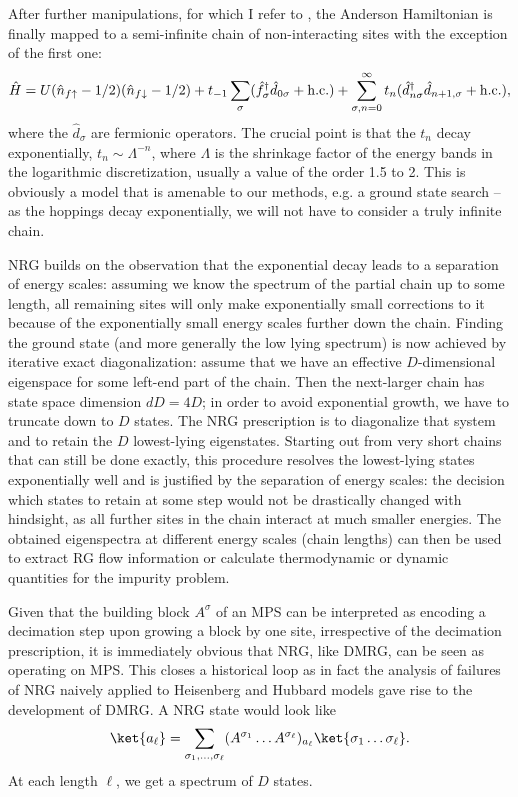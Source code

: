 After further manipulations, for which I refer to \cite{Wilson75,Bulla08}, the Anderson Hamiltonian is finally mapped to a semi-infinite chain of non-interacting sites with the exception of the first one:
\begin{equation} 
\hat{H}= U (\hat{n}_{f\uparrow}-1/2) (\hat{n}_{f\downarrow}-1/2) + t_{-1} \sum_\sigma (\hat{f}^\dagger_\sigma \hat{d}_{0\sigma} + {\rm h.c.}) + \sum_{\sigma,n=0}^\infty t_n (\hat{d}^\dagger_{n\sigma} \hat{d}_{n+1,\sigma} + {\rm h.c.}),
\end{equation}
where the $\hat{d}_{\sigma}$ are fermionic operators.  The crucial point is that the $t_n$ decay exponentially, $t_n \sim \Lambda^{-n}$, where $\Lambda$ is the shrinkage factor of the energy bands in the logarithmic discretization, usually a value of the order 1.5 to 2. This is obviously a model that is amenable to our methods, e.g. a ground state search -- as the hoppings decay exponentially, we will not have to consider a truly infinite chain. 

NRG builds on the observation that the exponential decay leads to a separation of energy scales: assuming we know the spectrum of the partial chain up to some length, all remaining sites will only make exponentially small corrections to it because of the exponentially small energy scales further down the chain. Finding the ground state (and more generally the low lying spectrum) is now achieved by  iterative exact diagonalization: assume that we have an effective $D$-dimensional eigenspace for some left-end part of the chain. Then the next-larger chain has state space dimension $dD=4D$; in order to avoid exponential growth, we have to truncate down to $D$ states. The NRG prescription is to diagonalize that system and to retain the $D$ lowest-lying eigenstates. Starting out from very short chains that can still be done exactly, this procedure resolves the lowest-lying states exponentially well and is justified by the separation of energy scales: the decision which states to retain at some step would not be drastically changed with hindsight, as all further sites in the chain interact at much smaller energies. The obtained eigenspectra at different energy scales (chain lengths) can then be used to extract RG flow information or calculate thermodynamic or dynamic quantities for the impurity problem. 

Given that the building block $A^\sigma$ of an MPS can be interpreted as encoding a decimation step upon growing a block by one site, irrespective of the decimation prescription, it is immediately obvious that NRG, like DMRG, can be seen as operating on MPS\cite{Weichselbaum09}. This closes a historical loop as in fact the analysis of failures of NRG  naively applied to Heisenberg and Hubbard models gave rise to the development of DMRG. A NRG  state would look like
\begin{equation}
\ket{a_\ell} = \sum_{\sigma_1,\ldots,\sigma_\ell} (A^{\sigma_1} \ldots  A^{\sigma_\ell})_{a_\ell} \ket{\sigma_1\ldots\sigma_\ell}.
\end{equation}
At each length $\ell$, we get a spectrum of $D$ states.

